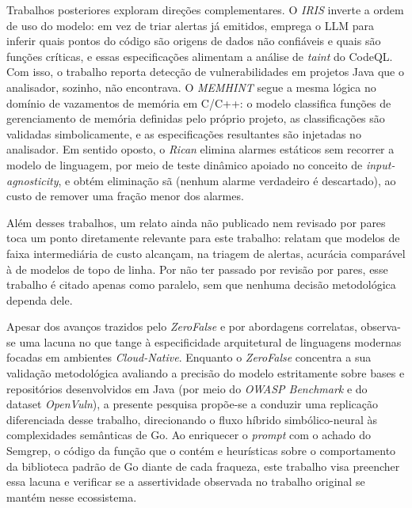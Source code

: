 Trabalhos posteriores exploram direções complementares. O \textit{IRIS} \cite{li2025iris} inverte a ordem de uso do modelo: em vez de triar alertas já emitidos, emprega o LLM para inferir quais pontos do código são origens de dados não confiáveis e quais são funções críticas, e essas especificações alimentam a análise de \textit{taint} do CodeQL. Com isso, o trabalho reporta detecção de vulnerabilidades em projetos Java que o analisador, sozinho, não encontrava. O \textit{MEMHINT} \cite{huang2026memhint} segue a mesma lógica no domínio de vazamentos de memória em C/C++: o modelo classifica funções de gerenciamento de memória definidas pelo próprio projeto, as classificações são validadas simbolicamente, e as especificações resultantes são injetadas no analisador. Em sentido oposto, o \textit{Rican} \cite{wang2026rican} elimina alarmes estáticos sem recorrer a modelo de linguagem, por meio de teste dinâmico apoiado no conceito de \textit{input-agnosticity}, e obtém eliminação sã (nenhum alarme verdadeiro é descartado), ao custo de remover uma fração menor dos alarmes.

Além desses trabalhos, um relato ainda não publicado nem revisado por pares toca um ponto diretamente relevante para este trabalho:  relatam que modelos de faixa intermediária de custo alcançam, na triagem de alertas, acurácia comparável à de modelos de topo de linha. Por não ter passado por revisão por pares, esse trabalho é citado apenas como paralelo, sem que nenhuma decisão metodológica dependa dele.

Apesar dos avanços trazidos pelo \textit{ZeroFalse} e por abordagens correlatas, observa-se uma lacuna no que tange à especificidade arquitetural de linguagens modernas focadas em ambientes \textit{Cloud-Native}. Enquanto o \textit{ZeroFalse} concentra a sua validação metodológica avaliando a precisão do modelo estritamente sobre bases e repositórios desenvolvidos em Java (por meio do \textit{OWASP Benchmark} e do dataset \textit{OpenVuln}), a presente pesquisa propõe-se a conduzir uma replicação diferenciada desse trabalho, direcionando o fluxo híbrido simbólico-neural às complexidades semânticas de Go. Ao enriquecer o \textit{prompt} com o achado do Semgrep, o código da função que o contém e heurísticas sobre o comportamento da biblioteca padrão de Go diante de cada fraqueza, este trabalho visa preencher essa lacuna e verificar se a assertividade observada no trabalho original se mantém nesse ecossistema.